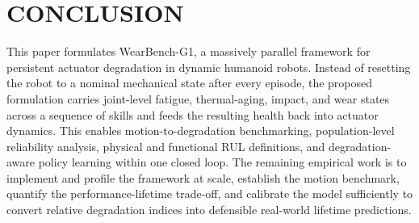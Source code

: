 \documentclass[letterpaper,10pt,conference]{ieeeconf}
\newif\ifdraftnotes
\newcommand{\tbd}[1]{\ifdraftnotes\par\noindent\textbf{[DRAFT TODO: #1]}\par\fi}
\begin{document}
\section{CONCLUSION}

This paper formulates WearBench-G1, a massively parallel framework for persistent actuator degradation in dynamic humanoid robots. Instead of resetting the robot to a nominal mechanical state after every episode, the proposed formulation carries joint-level fatigue, thermal-aging, impact, and wear states across a sequence of skills and feeds the resulting health back into actuator dynamics. This enables motion-to-degradation benchmarking, population-level reliability analysis, physical and functional RUL definitions, and degradation-aware policy learning within one closed loop. The remaining empirical work is to implement and profile the framework at scale, establish the motion benchmark, quantify the performance-lifetime trade-off, and calibrate the model sufficiently to convert relative degradation indices into defensible real-world lifetime predictions.

\tbd{Replace conclusion with measured findings and remove all draft TODO notes before submission.}

\balance


\end{document}
